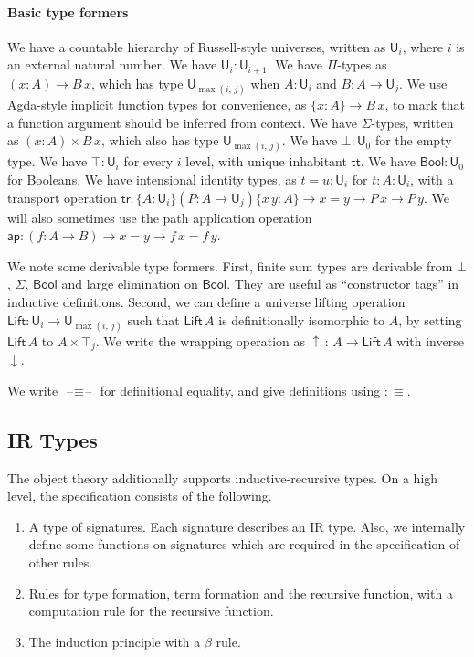 \documentclass[acmsmall,screen,review,anonymous]{acmart}
\newcommand{\msf}[1]{{\mathsf{#1}}}
\newcommand{\U}{\msf{U}}
\newcommand{\Lift}{\msf{Lift}}
\newcommand{\lup}{\uparrow}
\newcommand{\ldown}{\downarrow}
\newcommand{\ttt}{\msf{tt}}
\newcommand{\blank}{{\mathord{\hspace{1pt}\text{--}\hspace{1pt}}}}
\newcommand{\tr}{\msf{tr}}
\newcommand{\ap}{\msf{ap}}
\newcommand{\Bool}{\msf{Bool}}
\begin{document}
\paragraph{Basic type formers}
We have a countable hierarchy of Russell-style universes, written as $\U_i$, where $i$ is an
external natural number. We have $\U_i : \U_{i + 1}$. We have $\Pi$-types as $(x : A) \to B\,x$,
which has type $\U_{\max(i,\,j)}$ when $A : \U_i$ and $B : A \to \U_j$. We use Agda-style implicit
function types for convenience, as $\{x : A\} \to B\,x$, to mark that a function argument should be
inferred from context. We have $\Sigma$-types, written as $(x : A) \times B\,x$, which also has type
$\U_{\max(i,\,j)}$. We have $\bot : \U_0$ for the empty type. We have $\top : \U_i$ for every $i$
level, with unique inhabitant $\ttt$. We have $\Bool : \U_0$ for Booleans. We have intensional
identity types, as $t = u : \U_i$ for $t : A : \U_i$, with a transport operation $\tr : \{A :
\U_i\}(P : A \to \U_j)\{x\,y : A\} \to x = y \to P\,x \to P\,y$. We will also sometimes use the
path application operation $\ap : (f : A \to B) \to x = y \to f\,x = f\,y$.

We note some derivable type formers. First, finite sum types are derivable from $\bot$, $\Sigma$,
$\Bool$ and large elimination on $\Bool$. They are useful as ``constructor tags'' in
inductive definitions. Second, we can define a universe lifting operation $\Lift : \U_i \to
\U_{\max(i,\,j)}$ such that $\Lift\,A$ is definitionally isomorphic to $A$, by setting $\Lift\,A$
to $A \times \top_j$. We write the wrapping operation as $\lup\,:\,A \to \Lift\,A$ with inverse $\ldown$.

We write $\blank\!\!\equiv\!\!\blank$ for definitional equality, and give definitions using $:\equiv$.

\subsection{IR Types}
The object theory additionally supports inductive-recursive types. On a high level, the specification consists
of the following.
\begin{enumerate}
\item A type of signatures. Each signature describes an IR type. Also, we internally define some
  functions on signatures which are required in the specification of other rules.
\item Rules for type formation, term formation and the recursive function, with a computation rule
  for the recursive function.
\item The induction principle with a $\beta$ rule.
\end{enumerate}
\end{document}
